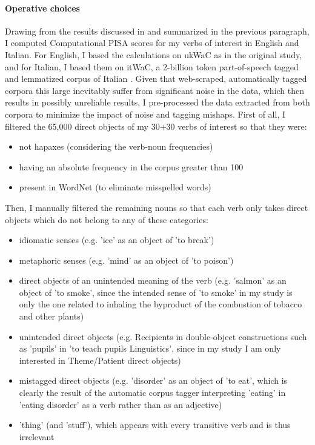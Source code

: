 \paragraph{Operative choices} 
Drawing from the results discussed in \textcite{CappelliLenciPISA} and summarized in the previous paragraph, I computed Computational PISA scores for my verbs of interest in English and Italian. For English, I based the calculations on ukWaC as in the original study, and for Italian, I based them on itWaC, a 2-billion token part-of-speech tagged and lemmatized corpus of Italian \parencite{baroni2009wacky}. Given that web-scraped, automatically tagged corpora this large inevitably suffer from significant noise in the data, which then results in possibly unreliable results, I pre-processed the data extracted from both corpora to minimize the impact of noise and tagging mishaps. First of all, I filtered the 65,000 direct objects of my 30+30 verbs of interest so that they were:
\begin{itemize}
    \item not hapaxes (considering the verb-noun frequencies)
    \item having an absolute frequency in the corpus greater than 100
    \item present in WordNet (to eliminate misspelled words)
\end{itemize}
Then, I manually filtered the remaining nouns so that each verb only takes direct objects which do not belong to any of these categories:
\begin{itemize}
    \item idiomatic senses (e.g. 'ice' as an object of 'to break')
    \item metaphoric senses (e.g. 'mind' as an object of 'to poison')
    \item direct objects of an unintended meaning of the verb (e.g. 'salmon' as an object of 'to smoke', since the intended sense of 'to smoke' in my study is only the one related to inhaling the byproduct of the combustion of tobacco and other plants)
    \item unintended direct objects (e.g. Recipients in double-object constructions such as 'pupils' in 'to teach pupils Linguistics', since in my study I am only interested in Theme/Patient direct objects)
    \item mistagged direct objects (e.g. 'disorder' as an object of 'to eat', which is clearly the result of the automatic corpus tagger interpreting 'eating' in 'eating disorder' as a verb rather than as an adjective)
    \item 'thing' (and 'stuff'), which appears with every transitive verb and is thus irrelevant
\end{itemize}
